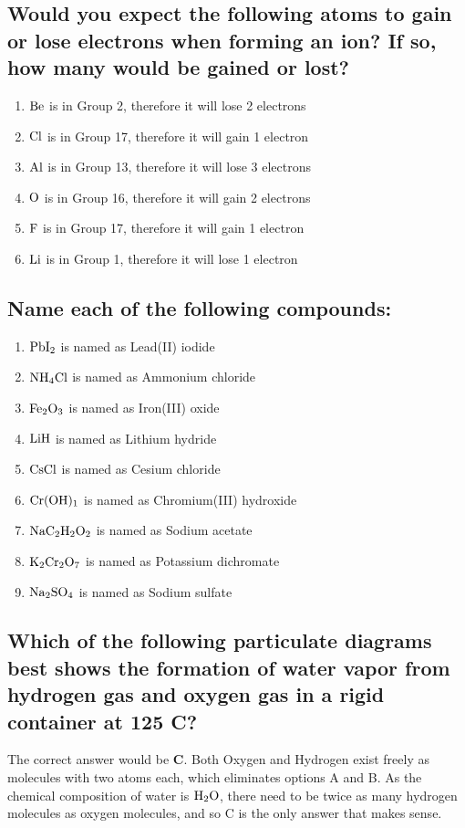 \documentclass[11pt]{article}
\begin{document}
\subsection{Would you expect the following atoms to gain or lose electrons when forming an ion? If so, how many would be gained or lost?}
\label{sec:orgf28d06e}
\begin{enumerate}
\item \(\ce{Be}\) is in Group 2, therefore it will lose 2 electrons
\item \(\ce{Cl}\) is in Group 17, therefore it will gain 1 electron
\item \(\ce{Al}\) is in Group 13, therefore it will lose 3 electrons
\item \(\ce{O}\) is in Group 16, therefore it will gain 2 electrons
\item \(\ce{F}\) is in Group 17, therefore it will gain 1 electron
\item \(\ce{Li}\) is in Group 1, therefore it will lose 1 electron
\end{enumerate}

\subsection{Name each of the following compounds:}
\label{sec:org296ce5f}
\begin{enumerate}
\item \(\ce{PbI2}\) is named as Lead(II) iodide
\item \(\ce{NH4Cl}\) is named as Ammonium chloride
\item \(\ce{Fe2O3}\) is named as Iron(III) oxide
\item \(\ce{LiH}\) is named as Lithium hydride
\item \(\ce{CsCl}\) is named as Cesium chloride
\item \(\ce{Cr(OH)1}\) is named as Chromium(III) hydroxide
\item \(\ce{NaC2H2O2}\) is named as Sodium acetate
\item \(\ce{K2Cr2O7}\) is named as Potassium dichromate
\item \(\ce{Na2SO4}\) is named as Sodium sulfate
\end{enumerate}

\subsection{Which of the following particulate diagrams best shows the formation of water vapor from hydrogen gas and oxygen gas in a rigid container at 125\textdegree{} C?}
\label{sec:org9856277}
The correct answer would be \textbf{C}. Both Oxygen and Hydrogen exist freely as molecules with two atoms each, which eliminates options A and B. As the chemical composition of water is \(\ce{H2O}\), there need to be twice as many hydrogen molecules as oxygen molecules, and so C is the only answer that makes sense.
\end{document}
